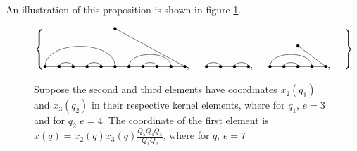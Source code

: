 \documentclass{amsart}
\begin{document}
 An illustration of this proposition is shown in figure \ref{coeff example}.
 
 
 \begin{figure}
 	\def\cbasisspacing{5mm}
 	
 	$\cbr{
 		\begin{gathered}
 		\GeneralizedMatching{11}{1/6, 2/3,4/5,7/10,8/9}{1}{11/1}{11/8}, \hspace{\cbasisspacing}
 		\Matching{4}{1/2, 3/4}, 
 		\hspace{\cbasisspacing}
 		\GeneralizedMatching{5}{1/4, 2/3}{1}{5/1}{3/4}, \hspace{\cbasisspacing}
 		\end{gathered}}$ 
 	\caption{Suppose the second and third elements have coordinates $x_2(q_1)$ and $x_3(q_2)$ in their respective kernel elements, where for $q_1$, $e=3$ and for $q_2$ $e=4$. The coordinate of the first element is $x(q)=x_2(q)x_3(q)\frac{Q_5Q_4Q_3}{Q_1Q_2}$, where for $q$, $e=7$}
 	\label{coeff example}
 \end{figure}
 
\end{document}
